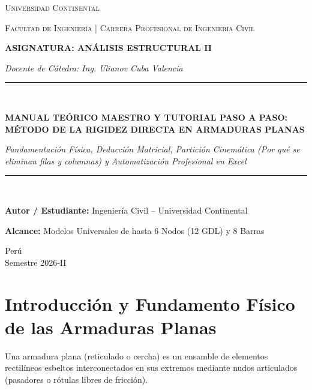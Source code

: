 \documentclass[11pt,a4paper]{article}
\begin{document}
\begin{titlepage}
    \centering
    \vspace*{1cm}
    {\scshape\LARGE Universidad Continental \par}
    \vspace{0.4cm}
    {\scshape\large Facultad de Ingeniería | Carrera Profesional de Ingeniería Civil \par}
    \vspace{1.5cm}
    {\Large\bfseries ASIGNATURA: ANÁLISIS ESTRUCTURAL II \par}
    \vspace{0.3cm}
    {\large\textit{Docente de Cátedra: Ing. Ulianov Cuba Valencia} \par}
    \vspace{2cm}
    \rule{\linewidth}{1.5pt} \\[0.4cm]
    {\huge\bfseries MANUAL TEÓRICO MAESTRO Y TUTORIAL PASO A PASO: MÉTODO DE LA RIGIDEZ DIRECTA EN ARMADURAS PLANAS \par}
    \vspace{0.2cm}
    {\Large\itshape Fundamentación Física, Deducción Matricial, Partición Cinemática (Por qué se eliminan filas y columnas) y Automatización Profesional en Excel \par}
    \rule{\linewidth}{1.5pt} \\[1.5cm]
    \vfill
    {\large\textbf{Autor / Estudiante:} Ingeniería Civil -- Universidad Continental \par}
    {\large\textbf{Alcance:} Modelos Universales de hasta 6 Nodos (12 GDL) y 8 Barras \par}
    \vspace{0.8cm}
    {\large Perú \\ Semestre 2026-II \par}
\end{titlepage}

\tableofcontents
\newpage

\section{Introducción y Fundamento Físico de las Armaduras Planas}

Una armadura plana (reticulado o cercha) es un ensamble de elementos rectilíneos esbeltos interconectados en sus extremos mediante nudos articulados (pasadores o rótulas libres de fricción).
\end{document}
